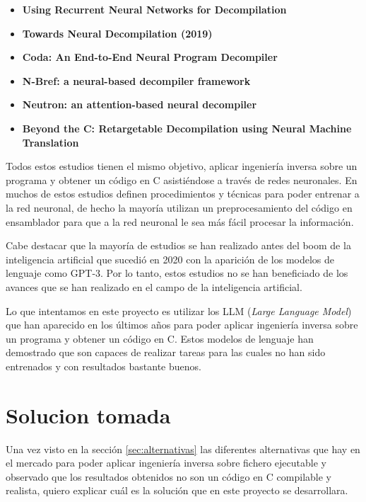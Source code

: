 \begin{itemize}
\item \textbf{Using Recurrent Neural Networks for Decompilation} \cite{8330222}
\item \textbf{Towards Neural Decompilation (2019)} \cite{KatzOmer2019TND}
\item \textbf{Coda: An End-to-End Neural Program Decompiler} \cite{FuCheng2019ANPD}
\item \textbf{N-Bref: a neural-based decompiler framework} \cite{fu2021nbref}
\item \textbf{Neutron: an attention-based neural decompiler} \cite{LiangRuigang2021Naan}
\item \textbf{Beyond the C: Retargetable Decompilation using Neural Machine Translation} \cite{HosseiniIman2022BtCR}
\end{itemize}

Todos estos estudios tienen el mismo objetivo, aplicar ingeniería inversa sobre un programa
y obtener un código en C asistiéndose a través de redes neuronales. En muchos de estos estudios
definen procedimientos y técnicas para poder entrenar a la red neuronal, de hecho la mayoría
utilizan un preprocesamiento del código en ensamblador para que a la red neuronal le sea más
fácil procesar la información.

Cabe destacar que la mayoría de estudios se han realizado antes del boom de la inteligencia artificial
que sucedió en 2020 con la aparición de los modelos de lenguaje como GPT-3. Por lo tanto, estos
estudios no se han beneficiado de los avances que se han realizado en el campo de la inteligencia
artificial.

Lo que intentamos en este proyecto es utilizar los LLM (\textit{Large Language Model}) que han aparecido
en los últimos años para poder aplicar ingeniería inversa sobre un programa y obtener un código
en C. Estos modelos de lenguaje han demostrado que son capaces de realizar tareas para las cuales
no han sido entrenados y con resultados bastante buenos.

\section{Solucion tomada}
\label{sec:solucion}


Una vez visto en la sección \ref{sec:alternativas} las diferentes alternativas que hay
en el mercado para poder aplicar ingeniería inversa sobre fichero ejecutable y observado
que los resultados obtenidos no son un código en C compilable y realista, quiero explicar
cuál es la solución que en este proyecto se desarrollara.

